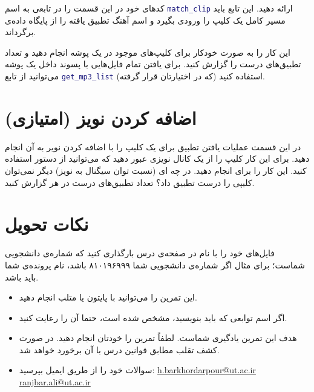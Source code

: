 \documentclass{utsignal}
\begin{document}
	کد‌های خود در این قسمت را در تابعی به اسم \lstinline[language=Matlab]{match_clip} ارائه دهید. این تابع باید مسیر کامل یک کلیپ را ورودی بگیرد و اسم آهنگ تطبیق یافته را از پایگاه داده‌ی  برگرداند.
	
	این کار را به صورت خودکار برای کلیپ‌های موجود در یک پوشه انجام دهید و تعداد تطبیق‌های درست را گزارش کنید. برای یافتن تمام فایل‌هایی با پسوند  داخل یک پوشه می‌توانید از تابع \lstinline[language=Matlab]{get_mp3_list} (که در اختیارتان قرار گرفته) استفاده کنید.
	
	\section{اضافه کردن نویز (امتیازی)}
	در این قسمت عملیات یافتن تطبیق برای یک کلیپ را با اضافه کردن نویر به آن انجام دهید. برای این کار کلیپ را از یک کانال نویزی عبور دهید که می‌توانید از دستور  استفاده کنید. این کار را برای  انجام دهید. در چه ای (نسبت توان سیگنال به نویز) دیگر نمی‌توان کلیپی را درست تطبیق داد؟ تعداد تطبیق‌های درست در هر  گزارش کنید.
	
	\section*{نکات تحویل}
	فایل‌های خود را با نام  در صفحه‌ی  درس بارگذاری کنید که  شماره‌ی دانشجویی شماست؛ برای مثال اگر شماره‌ی دانشجویی شما ۸۱۰۱۹۶۹۹۹ باشد، نام پرونده‌ی شما باید  باشد.
	\begin{itemize}
		\item این تمرین را می‌توانید با پایتون یا متلب انجام دهید.
		\item اگر اسم توابعی که باید بنویسید، مشخص شده است، حتما آن را رعایت کنید.
		\item هدف این تمرین یادگیری شماست. لطفاً تمرین را خودتان انجام دهید. در صورت کشف تقلب مطابق قوانین درس با آن برخورد خواهد شد.
		\item سوالات خود را از طریق ایمیل بپرسید:
		\subitem \href{mailto:h.barkhordarpour@ut.ac.ir?subject=[SS\%20S98 P1]}{h.barkhordarpour@ut.ac.ir}
		\subitem \href{mailto:ranjbar.ali@ut.ac.ir?subject=[SS\%20S98 P1]}{ranjbar.ali@ut.ac.ir}
	\end{itemize}
\end{document}
